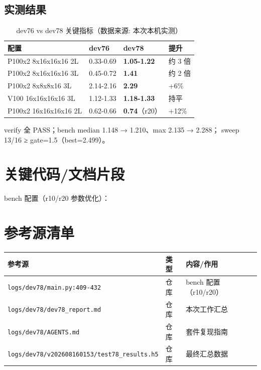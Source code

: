 \documentclass[UTF8]{ctexart}
\begin{document}
\subsection{实测结果}
\begin{table}[htbp]\centering
\begin{tabular}{llll}
\toprule
配置 & dev76 & dev78 & 提升 \\
\midrule
P100x2 8x16x16x16 2L & 0.33-0.69 & \textbf{1.05-1.22} & 约 3 倍 \\
P100x2 8x16x16x16 3L & 0.45-0.72 & \textbf{1.41} & 约 2 倍 \\
P100x2 8x8x8x16 3L & 2.14-2.16 & \textbf{2.29} & +6\% \\
V100 16x16x16x16 3L & 1.12-1.33 & \textbf{1.18-1.33} & 持平 \\
P100x2 16x16x16x16 2L & 0.62-0.66 & \textbf{0.74}（r20） & +12\% \\
\bottomrule
\end{tabular}
\caption{dev76 vs dev78 关键指标（数据来源: 本次本机实测）}
\end{table}

verify 全 PASS；bench median 1.148 → 1.210、max 2.135 → 2.288；
sweep 13/16 ≥ gate=1.5（best=2.499）。

\section{关键代码/文档片段}
bench 配置（r10/r20 参数优化）：


\section{参考源清单}
\begin{xltabular}{\textwidth}{llX}
\toprule
\textcolor{evidence}{参考源} & 类型 & 内容/作用 \\
\midrule
\endhead
\texttt{\nolinkurl{logs/dev78/main.py:409-432}} & 仓库 & bench 配置（r10/r20） \\
\texttt{\nolinkurl{logs/dev78/dev78_report.md}} & 仓库 & 本次工作汇总 \\
\texttt{\nolinkurl{logs/dev78/AGENTS.md}} & 仓库 & 套件复现指南 \\
\texttt{\nolinkurl{logs/dev78/v202608160153/test78_results.h5}} & 仓库 & 最终汇总数据 \\
\bottomrule
\end{xltabular}
\end{document}
